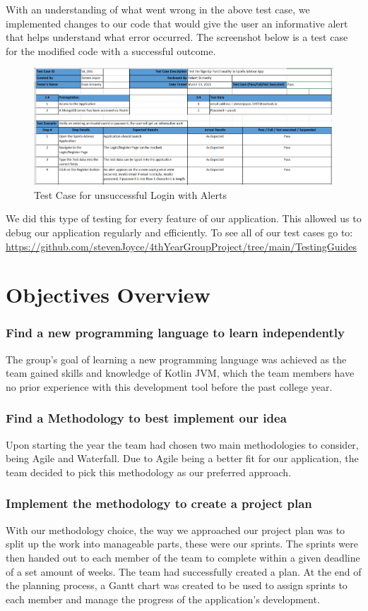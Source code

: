 With an understanding of what went wrong in the above test case, we implemented changes to our code that would give the user an informative alert that helps understand what error occurred. The screenshot below is a test case for the modified code with a successful outcome.
\begin{figure}[H]
    \centering
    \includegraphics[width=15cm, height = 6.5 cm]{img/testCaseSignInError.PNG}
    \caption{Test Case for unsuccessful Login with Alerts}
    \label{fig:Test Case for unsuccessful Login with Alerts}
\end{figure}
We did this type of testing for every feature of our application. This allowed us to debug our application regularly and efficiently. To see all of our test cases go to:  \url{https://github.com/stevenJoyce/4thYearGroupProject/tree/main/TestingGuides}
\section{Objectives Overview}
\subsubsection{Find a new programming language to learn independently}
The group's goal of learning a new programming language was achieved as the team gained skills and knowledge of Kotlin JVM, which the team members have no prior experience with this development tool before the past college year.
\subsubsection {Find a Methodology to best implement our idea}
Upon starting the year the team had chosen two main methodologies to consider, being Agile and Waterfall. Due to Agile being a better fit for our application, the team decided to pick this methodology as our preferred approach.
\subsubsection {Implement the methodology to create a project plan}
With our methodology choice, the way we approached our project plan was to split up the work into manageable parts, these were our sprints. The sprints were then handed out to each member of the team to complete within a given deadline of a set amount of weeks. The team had successfully created a plan. At the end of the planning process, a Gantt chart was created to be used to assign sprints to each member and manage the progress of the application's development.
